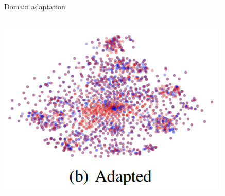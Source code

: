 \documentclass[aspectratio=141]{beamer}
\begin{document}
\begin{frame}{Domain adaptation}
\begin{columns}
{\begin{center}
{{                \includegraphics[width=\linewidth]{imgs/da_adapted.png}}}
            \end{center}
        }
    \end{columns}
\end{frame}
\end{document}
